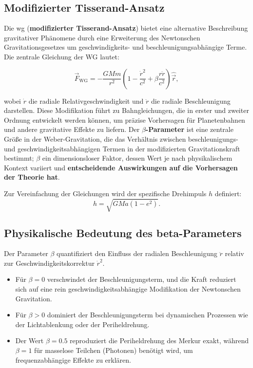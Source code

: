 \subsection{Modifizierter Tisserand-Ansatz}
Die \gls{wg} (\textbf{modifizierter Tisserand-Ansatz}) bietet eine alternative Beschreibung gravitativer Phänomene durch eine Erweiterung des Newtonschen Gravitationsgesetzes um
geschwindigkeits- und beschleunigungsabhängige Terme. Die zentrale Gleichung der WG lautet:

\begin{equation}
\vec{F}_{\text{WG}} = -\frac{GMm}{r^2} \left(1 - \frac{\dot{r}^2}{c^2} + \beta \frac{r\ddot{r}}{c^2}\right) \hat{\vec{r}},
\end{equation}

wobei $\dot{r}$ die radiale Relativgeschwindigkeit und $\ddot{r}$ die radiale Beschleunigung darstellen. Diese Modifikation führt zu Bahngleichungen, die in
erster und zweiter Ordnung entwickelt werden können, um präzise Vorhersagen für Planetenbahnen und andere gravitative Effekte zu liefern. Der \textbf{$\beta$-Parameter} ist
eine zentrale Größe in der Weber-Gravitation, die das Verhältnis zwischen beschleunigungs- und geschwindigkeitsabhängigen Termen in der modifizierten
Gravitationskraft bestimmt; $\beta$ ein dimensionsloser Faktor, dessen Wert je nach physikalischem Kontext variiert und \textbf{entscheidende Auswirkungen auf die Vorhersagen
der Theorie hat}.

Zur Vereinfachung der Gleichungen wird der spezifische Drehimpuls $h$ definiert:
\begin{equation}
h = \sqrt{GMa(1 - e^2)}.
\end{equation}

\subsection{Physikalische Bedeutung des beta-Parameters}
Der Parameter $\beta$ quantifiziert den Einfluss der radialen Beschleunigung $\ddot{r}$ relativ zur Geschwindigkeitskorrektur $\dot{r}^2$.
\begin{itemize}
    \item Für $\beta=0$ verschwindet der Beschleunigungsterm, und die Kraft reduziert sich auf eine rein geschwindigkeitsabhängige Modifikation der Newtonschen Gravitation.
    \item Für $\beta>0$ dominiert der Beschleunigungsterm bei dynamischen Prozessen wie der Lichtablenkung oder der Periheldrehung.
    \item Der Wert $\beta=0.5$ reproduziert die Periheldrehung des Merkur exakt, während $\beta=1$ für masselose Teilchen (Photonen) benötigt wird, um frequenzabhängige Effekte zu erklären.
\end{itemize}

